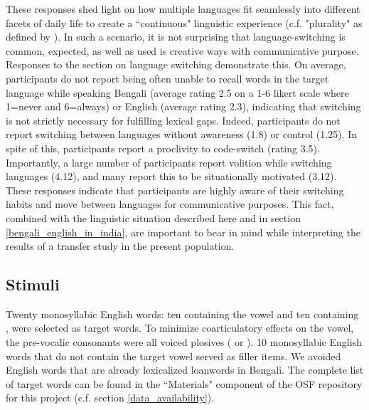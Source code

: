\documentclass[12 pt]{article}
\newcommand{\nt}[1]{\textipa{[#1]}} %
\begin{document}
These responses shed light on how multiple languages fit seamlessly into different facets of daily life to create a ``continuous" linguistic experience (c.f. "plurality" as defined by \cite{khubchandani2021plural}). In such a scenario, it is not surprising that language-switching is common, expected, as well as used is creative ways with communicative purpose. Responses to the section on language switching demonstrate this. On average, participants do not report being often unable to recall words in the target language while speaking Bengali (average rating 2.5 on a 1-6 likert scale where 1=never and 6=always) or English (average rating 2.3), indicating that switching is not strictly necessary for fulfilling lexical gaps. Indeed, participants do not report switching between languages without awareness (1.8) or control (1.25). In spite of this, participants report a proclivity to code-switch (rating 3.5). Importantly, a large number of participants report volition while switching languages (4.12), and many report this to be situationally motivated (3.12). These responses indicate that participants are highly aware of their switching habits and move between languages for communicative purposes. This fact, combined with the linguistic situation described here and in section \ref{bengali_english_in_india}, are important to bear in mind while interpreting the results of a transfer study in the present population. 


\subsection{Stimuli}
Twenty monosyllabic English words: ten containing the vowel \nt{2} and ten containing \nt{\ae}, were selected as target words. To minimize coarticulatory effects on the vowel, the pre-vocalic consonants were all voiced plosives (\nt{b} or \nt{d}). 10 monosyllabic English words that do not contain the target vowel served as filler items. We avoided English words that are already lexicalized loanwords in Bengali. The complete list of target words can be found in the ``Materials" component of the OSF repository for this project (c.f. section \ref{data_availability}).
\end{document}

